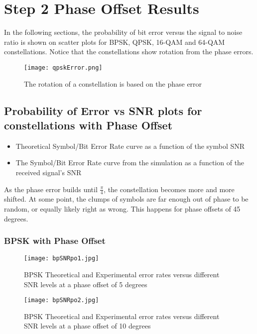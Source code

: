 \documentclass[]{article}
\begin{document}
\newpage
\section{Step 2 Phase Offset Results}
\label{sec:results_po}
In the following sections, the probability of bit error versus the signal to noise ratio is shown on scatter plots for BPSK, QPSK, 16-QAM and 64-QAM constellations.  Notice that the constellations show rotation from the phase errors.  

\begin{figure}[H]
\centering
\hspace*{-2cm}\texttt{[image: qpskError.png]}
\caption{The rotation of a constellation is based on the phase error}
\end{figure}

\subsection{Probability of Error vs SNR plots for constellations with Phase Offset}
\begin{itemize}
\item Theoretical Symbol/Bit Error Rate curve as a function of the symbol SNR
\item The Symbol/Bit Error Rate curve from the simulation as a function of the received signal's SNR
\end{itemize}

As the phase error builds until $\frac{\pi}{4}$, the constellation becomes more and more shifted.  At some point, the clumps of symbols are far enough out of phase to be random, or equally likely right as wrong.  This happens for phase offsets of 45 degrees.
\subsubsection{BPSK with Phase Offset}
\label{sec:bpsk_phase}
\begin{figure}[H]
\centering
\hspace*{-2cm}\texttt{[image: bpSNRpo1.jpg]}
\caption{BPSK Theoretical and Experimental error rates versus different SNR levels at a phase offset of 5 degrees }
\end{figure}

\begin{figure}[H]
\centering
\hspace*{-2cm}\texttt{[image: bpSNRpo2.jpg]}
\caption{BPSK Theoretical and Experimental error rates versus different SNR levels at a phase offset of 10 degrees }
\end{figure}
\end{document}
